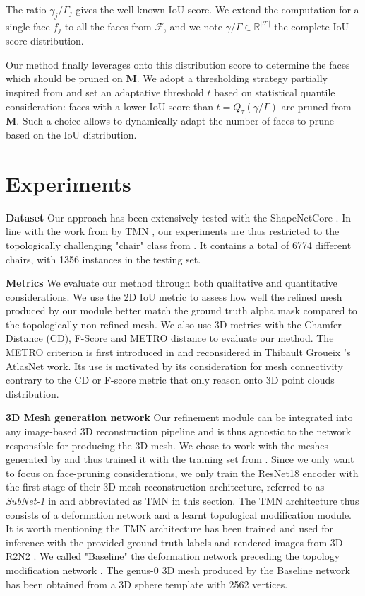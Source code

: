 The ratio $\gamma_{j}/\Gamma_{j}$ gives the well-known IoU score. We extend the computation for a single face $f_{j}$ to all the faces from $\mathcal{F}$, and we note $\gamma/\Gamma \in \mathbb{R}^{|\mathcal{F}|}$ the complete IoU score distribution.

Our method finally leverages onto this distribution score to determine the faces which should be pruned on $\mathbf{M}$. We adopt a thresholding strategy partially inspired from \citep{pan2019deep} and set an adaptative threshold $t$ based on statistical quantile consideration: faces with a lower IoU score than $t=Q_{\tau}(\gamma/\Gamma)$ are pruned from $\mathbf{M}$. Such a choice allows to dynamically adapt the number of faces to prune based on the IoU distribution. 

\section{Experiments}
\label{sec:experiments}

\textbf{Dataset} Our approach has been extensively tested with the ShapeNetCore \citep{chang2015shapenet}. In line with the work from by TMN \citep{pan2019deep}, our experiments are thus restricted to the topologically challenging "chair" class from \citep{chang2015shapenet}. It contains a total of 6774 different chairs, with 1356 instances in the testing set.

\noindent\textbf{Metrics} We evaluate our method through both qualitative and quantitative considerations. We use the 2D IoU metric to assess how well the refined mesh produced by our module better match the ground truth alpha mask compared to the topologically non-refined mesh. We also use 3D metrics with the Chamfer Distance (CD), F-Score and METRO distance to evaluate our method. The METRO criterion is first introduced in \citep{cignoni1998metro} and reconsidered in Thibault Groueix \etal 's AtlasNet \citep{groueix2018papier} work. Its use is motivated by its consideration for mesh connectivity contrary to the CD or F-score metric that only reason onto 3D point clouds distribution. 

\noindent\textbf{3D Mesh generation network} Our refinement module can be integrated into any image-based 3D reconstruction pipeline and is thus agnostic to the network responsible for producing the 3D mesh. We chose to work with the meshes generated by \citep{pan2019deep} and thus trained it with the training set from \citep{chang2015shapenet}. Since we only want to focus on face-pruning considerations, we only train the ResNet18 encoder with the first stage of their 3D mesh reconstruction architecture, referred to as \textit{SubNet-1} in \citep{pan2019deep} and abbreviated as TMN in this section. The TMN architecture thus consists of a deformation network and a learnt topological modification module. It is worth mentioning the TMN \citep{pan2019deep} architecture has been trained and used for inference with the provided ground truth labels and rendered images from 3D-R2N2 \citep{choy20163d}. We called "Baseline" the deformation network preceding the topology modification network \citep{pan2019deep}. The genus-0 3D mesh produced by the Baseline network has been obtained from a 3D sphere template with 2562 vertices. 

